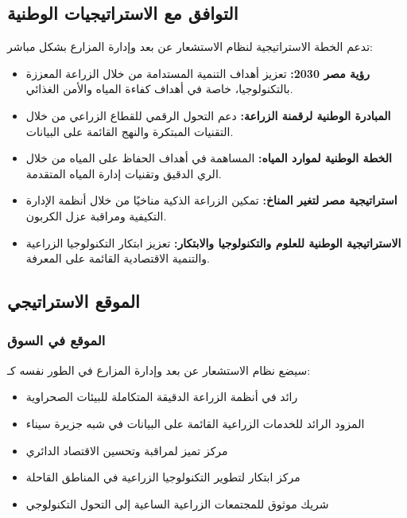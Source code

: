 \subsection{التوافق مع الاستراتيجيات الوطنية}

تدعم الخطة الاستراتيجية لنظام الاستشعار عن بعد وإدارة المزارع بشكل مباشر:

\begin{itemize}
    \item \textbf{رؤية مصر 2030:} تعزيز أهداف التنمية المستدامة من خلال الزراعة المعززة بالتكنولوجيا، خاصة في أهداف كفاءة المياه والأمن الغذائي.
    
    \item \textbf{المبادرة الوطنية لرقمنة الزراعة:} دعم التحول الرقمي للقطاع الزراعي من خلال التقنيات المبتكرة والنهج القائمة على البيانات.
    
    \item \textbf{الخطة الوطنية لموارد المياه:} المساهمة في أهداف الحفاظ على المياه من خلال الري الدقيق وتقنيات إدارة المياه المتقدمة.
    
    \item \textbf{استراتيجية مصر لتغير المناخ:} تمكين الزراعة الذكية مناخيًا من خلال أنظمة الإدارة التكيفية ومراقبة عزل الكربون.
    
    \item \textbf{الاستراتيجية الوطنية للعلوم والتكنولوجيا والابتكار:} تعزيز ابتكار التكنولوجيا الزراعية والتنمية الاقتصادية القائمة على المعرفة.
\end{itemize}

\subsection{الموقع الاستراتيجي}

\subsubsection{الموقع في السوق}
سيضع نظام الاستشعار عن بعد وإدارة المزارع في الطور نفسه كـ:

\begin{itemize}
    \item رائد في أنظمة الزراعة الدقيقة المتكاملة للبيئات الصحراوية
    \item المزود الرائد للخدمات الزراعية القائمة على البيانات في شبه جزيرة سيناء
    \item مركز تميز لمراقبة وتحسين الاقتصاد الدائري
    \item مركز ابتكار لتطوير التكنولوجيا الزراعية في المناطق القاحلة
    \item شريك موثوق للمجتمعات الزراعية الساعية إلى التحول التكنولوجي
\end{itemize}

